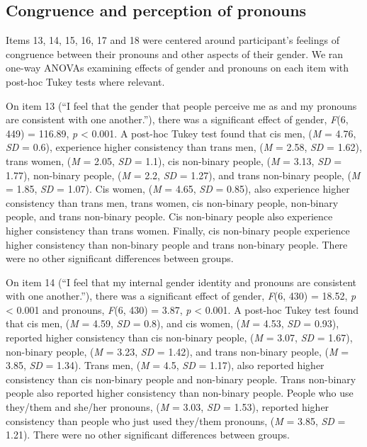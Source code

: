 \documentclass[12pt,twoside]{reedthesis}
\begin{document}
\hypertarget{congruence-and-perception-of-pronouns}{%
\subsection{Congruence and perception of pronouns}\label{congruence-and-perception-of-pronouns}}

Items 13, 14, 15, 16, 17 and 18 were centered around participant's feelings of congruence between their pronouns and other aspects of their gender. We ran one-way ANOVAs examining effects of gender and pronouns on each item with post-hoc Tukey tests where relevant.

On item 13 (``I feel that the gender that people perceive me as and my pronouns are consistent with one another.''), there was a significant effect of gender, \emph{F}(6, 449) = 116.89, \emph{p} \textless{} 0.001. A post-hoc Tukey test found that cis men, (\emph{M} = 4.76, \emph{SD} = 0.6), experience higher consistency than trans men, (\emph{M} = 2.58, \emph{SD} = 1.62), trans women, (\emph{M} = 2.05, \emph{SD} = 1.1), cis non-binary people, (\emph{M} = 3.13, \emph{SD} = 1.77), non-binary people, (\emph{M} = 2.2, \emph{SD} = 1.27), and trans non-binary people, (\emph{M} = 1.85, \emph{SD} = 1.07). Cis women, (\emph{M} = 4.65, \emph{SD} = 0.85), also experience higher consistency than trans men, trans women, cis non-binary people, non-binary people, and trans non-binary people. Cis non-binary people also experience higher consistency than trans women. Finally, cis non-binary people experience higher consistency than non-binary people and trans non-binary people. There were no other significant differences between groups.

On item 14 (``I feel that my internal gender identity and pronouns are consistent with one another.''), there was a significant effect of gender, \emph{F}(6, 430) = 18.52, \emph{p} \textless{} 0.001 and pronouns, \emph{F}(6, 430) = 3.87, \emph{p} \textless{} 0.001. A post-hoc Tukey test found that cis men, (\emph{M} = 4.59, \emph{SD} = 0.8), and cis women, (\emph{M} = 4.53, \emph{SD} = 0.93), reported higher consistency than cis non-binary people, (\emph{M} = 3.07, \emph{SD} = 1.67), non-binary people, (\emph{M} = 3.23, \emph{SD} = 1.42), and trans non-binary people, (\emph{M} = 3.85, \emph{SD} = 1.34). Trans men, (\emph{M} = 4.5, \emph{SD} = 1.17), also reported higher consistency than cis non-binary people and non-binary people. Trans non-binary people also reported higher consistency than non-binary people. People who use they/them and she/her pronouns, (\emph{M} = 3.03, \emph{SD} = 1.53), reported higher consistency than people who just used they/them pronouns, (\emph{M} = 3.85, \emph{SD} = 1.21). There were no other significant differences between groups.
\end{document}

